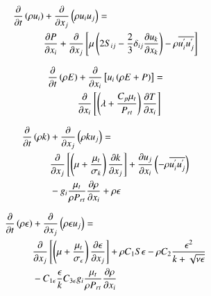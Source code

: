 \documentclass[preprint,12pt]{elsarticle}
\begin{document}
\begin{equation}
\centering
\begin{split}
\frac{\partial }{\partial t} \left( \rho u_i \right) &+ \frac{\partial }{\partial x_j } \left( \rho u_i u_j \right) = \\
 &\frac{\partial P}{\partial x_i } + \frac{\partial }{\partial x_j } \left[ \mu \left( 2 S_{ij} - \frac{2}{3} \delta_{ij} \frac{\partial u_k }{\partial x_k } \right) - \rho \overline{u^{'}_{i} u^{'}_{j}} \right] 
\label{eq:momentum}
\end{split}
\end{equation}

\begin{equation}
\centering
\begin{split}
\frac{\partial }{\partial t } \left( \rho E \right) &+ \frac{\partial }{\partial x_i} \left[ u_i \left( \rho E + P \right) \right] = \\
 &\frac{\partial }{\partial x_i } \left[ \left( \lambda + \frac{C_p \mu_t }{P_{rt}} \right) \frac{\partial T}{\partial x_i} \right] 
\label{eq:energy}
\end{split}
\end{equation}

\begin{equation}
\centering
\begin{split}
\frac{\partial }{\partial t} \left(\rho k \right) &+ \frac{\partial }{\partial x_j} \left( \rho k u_j \right) = \\
&\frac{\partial }{\partial x_j} \left[ \left( \mu + \frac{\mu_t}{\sigma_k} \right) \frac{\partial k}{\partial x_j} \right] + \frac{\partial u_j}{\partial x_i} \left( -\rho \overline{u^{'}_{i} u^{'}_{j}} \right) \\
&- g_i \frac{\mu_t}{\rho P_{rt}} \frac{\partial \rho }{\partial x_i} + \rho \epsilon
\label{eq:k}
\end{split}
\end{equation}

\begin{equation}
\centering
\begin{split}
 \frac{\partial }{\partial t} \left(\rho \epsilon \right) &+ \frac{\partial }{\partial x_j} \left( \rho \epsilon u_j \right) = \\
 &\frac{\partial }{\partial x_j } \left[ \left( \mu + \frac{\mu_t }{\sigma_\epsilon } \right) \frac{\partial \epsilon }{\partial x_j } \right] + \rho C_1 S \epsilon - \rho C_2 \frac{\epsilon^2 }{k+\sqrt{\nu \epsilon}} \\
 &- C_{1 \epsilon} \frac{\epsilon}{k} C_{3\epsilon} g_i \frac{\mu_t}{\rho P_{rt}} \frac{\partial \rho}{\partial x_i}
\label{eq:e}
\end{split}
\end{equation}
\end{document}
